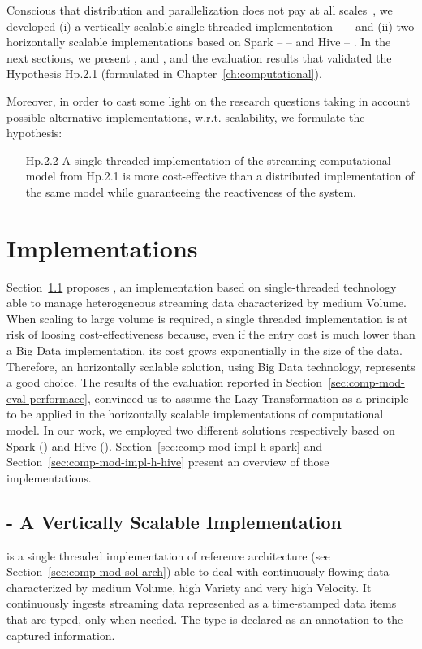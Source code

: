 Conscious that distribution and parallelization does not pay at all scales~\cite{bodendistributed}, we developed (i) a vertically scalable single threaded implementation -- \sti{} -- and (ii) two horizontally scalable implementations based on Spark -- \sparkdi{} -- and Hive -- \hivedi{}.
In the next sections, we present \sti{}, \sparkdi{} and \hivedi{}, and the evaluation results that validated the Hypothesis \textsf{Hp.2.1} (formulated in Chapter~\ref{ch:computational}).

Moreover, in order to cast some light on the research questions taking in account possible alternative implementations, w.r.t. scalability, we formulate the hypothesis: 
\begin{itemize}[leftmargin=42pt]
\item[\textsf{Hp.2.2}] A single-threaded implementation of the streaming computational model from \textsf{Hp.2.1} is more cost-effective than a distributed implementation of the same model while guaranteeing the reactiveness of the system.
\end{itemize}

\section{Implementations} \label{sec:comp-mod-impl}
Section~\ref{sec:comp-mod-impl-v} proposes \sti{}, an implementation based on single-threaded technology able to manage heterogeneous streaming data characterized by medium Volume.
When scaling to large volume is required, a single threaded implementation is at risk of loosing cost-effectiveness because, even if the entry cost is much lower than a Big Data implementation, its cost grows exponentially in the size of the data. Therefore, an horizontally scalable solution, using Big Data technology, represents a good choice.
The results of the evaluation reported in Section~\ref{sec:comp-mod-eval-performace}, convinced us to assume the \textsf{Lazy Transformation} as a principle to be applied in the horizontally scalable implementations of \river{} computational model.
In our work, we employed two different solutions respectively based on Spark (\sparkdi{}) and Hive (\hivedi{}).
Section~\ref{sec:comp-mod-impl-h-spark} and Section~\ref{sec:comp-mod-impl-h-hive} present an overview of those implementations.

\subsection{\sti{} - A Vertically Scalable Implementation} \label{sec:comp-mod-impl-v}
\sti{} is a single threaded implementation of \river{} reference architecture (see Section~\ref{sec:comp-mod-sol-arch}) able to deal with continuously flowing data characterized by medium Volume, high Variety and very high Velocity. 
It continuously ingests streaming data represented as a time-stamped data items that are typed, only when needed. The type is declared as an annotation to the captured information.

